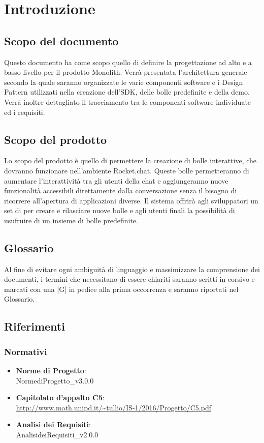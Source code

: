 
\section{Introduzione}
\subsection{Scopo del documento}

Questo documento ha come scopo quello di definire la progettazione ad
alto  e a basso livello
per il prodotto Monolith. Verrà presentata l'architettura generale secondo la quale
saranno organizzate le varie componenti software e i Design Pattern utilizzati nella
creazione dell'SDK, delle bolle predefinite e della demo. Verrà inoltre dettagliato il tracciamento tra le componenti software individuate ed i requisiti.


\subsection{Scopo del prodotto}

Lo scopo del prodotto è quello di permettere la creazione di bolle
interattive, che dovranno funzionare nell'ambiente Rocket.chat. Queste
bolle permetteranno di aumentare l'interattività tra gli utenti della
chat e aggiungeranno nuove funzionalità accessibili direttamente dalla conversazione 
senza il bisogno di ricorrere all'apertura di applicazioni diverse.
Il sistema offrirà agli sviluppatori un set di  per creare e
rilasciare nuove bolle e agli utenti finali la possibilità di
usufruire di un insieme di bolle predefinite.


\subsection{Glossario}

Al fine di evitare ogni ambiguità di linguaggio e massimizzare la
comprensione dei documenti, i termini che necessitano di essere
chiariti saranno scritti in corsivo e marcati con una |G| in pedice alla prima
occorrenza e saranno riportati nel Glossario.

\subsection{Riferimenti}

\subsubsection{Normativi}
\begin{itemize}
	\item \textbf{Norme di Progetto}: \\ NormediProgetto\_v3.0.0
	\item \textbf{Capitolato d'appalto C5}: \\ \url{http://www.math.unipd.it/~tullio/IS-1/2016/Progetto/C5.pdf}
	\item \textbf{Analisi dei Requisiti}: \\ AnalisideiRequisiti\_v2.0.0
	
\end{itemize}


